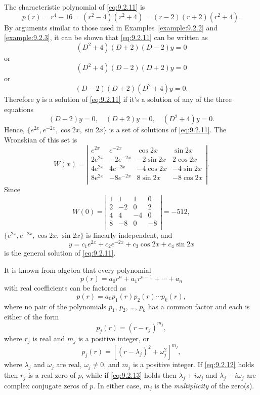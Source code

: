 \begin{examplesolution}
\solution The characteristic polynomial of \eqref{eq:9.2.11} is
\[
  p(r)=r^{4}-16=(r^{2}-4)(r^{2}+4)=(r-2)(r+2)(r^{2}+4).
\]
By arguments similar to those used in Examples~\ref{example:9.2.2} and \ref{example:9.2.3}, it can
be shown that \eqref{eq:9.2.11} can be written as
\[
  (D^{2}+4)(D+2)(D-2)y=0
\]
or
\[
  (D^{2}+4)(D-2)(D+2)y=0
\]
or
\[
  (D-2)(D+2)(D^{2}+4)y=0.
\]
Therefore $y$ is a solution of \eqref{eq:9.2.11} if it's a solution of any of the three equations
\[
  (D-2)y=0,\quad(D+2)y=0,\quad(D^{2}+4)y=0.
\]
Hence, $\{e^{2x},e^{-2x},\cos2x,\sin2x\}$ is a set of solutions of \eqref{eq:9.2.11}. The Wronskian
of this set is
\[
  W(x)=\left|
  \begin{array}{rrrr}
    e^{2x}  & e^{-2x}   & \cos2x   & \sin2x   \\
    2e^{2x} & -2e^{-2x} & -2\sin2x & 2\cos2x  \\
    4e^{2x} & 4e^{-2x}  & -4\cos2x & -4\sin2x \\
    8e^{2x} & -8e^{-2x} & 8\sin2x  & -8\cos2x \\
  \end{array}\right|.
\]
Since
\[
  W(0)=\left|
  \begin{array}{rrrr}
    1 & 1  & 1  & 0  \\
    2 & -2 & 0  & 2  \\
    4 & 4  & -4 & 0  \\
    8 & -8 & 0  & -8 \\
  \end{array}\right|=-512,
\]
$\{e^{2x},e^{-2x},\cos2x,\sin2x\}$ is linearly independent, and
\[
  y=c_{1}e^{2x}+c_{2}e^{-2x}+c_{3}\cos2x+c_{4}\sin2x
\]
is the general solution of \eqref{eq:9.2.11}.
\end{examplesolution}

It is known from algebra that every polynomial
\[
  p(r)=a_{0}r^{n}+a_{1}r^{n-1}+\cdots+a_{n}
\]
with real coefficients can be factored as
\[
  p(r)=a_{0}p_{1}(r)p_{2}(r)\cdots p_{k}(r),
\]
where no pair of the polynomials $p_{1}$, $p_{2}$, \dots, $p_{k}$ has a common factor and each is
either of the form
\begin{equation}
  \label{eq:9.2.12}p_{j}(r)=(r-r_{j})^{m_{j}},
\end{equation}
where $r_{j}$ is real and $m_{j}$ is a positive integer, or
\begin{equation}
  \label{eq:9.2.13}p_{j}(r)=\left[(r-\lambda_{j})^{2}+\omega_{j}^{2}\right]^{m_{j}},
\end{equation}
where $\lambda_{j}$ and $\omega_{j}$ are real, $\omega_{j}\ne0$, and $m_{j}$ is a positive integer.
If \eqref{eq:9.2.12} holds then $r_{j}$ is a real zero of $p$, while if \eqref{eq:9.2.13} holds then
$\lambda_{j}+i\omega_{j}$ and $\lambda_{j}-i\omega_{j}$ are complex conjugate zeros of $p$. In either case, $m_{j}$
is the {\color{blue}\it multiplicity\/} of the zero(s).

